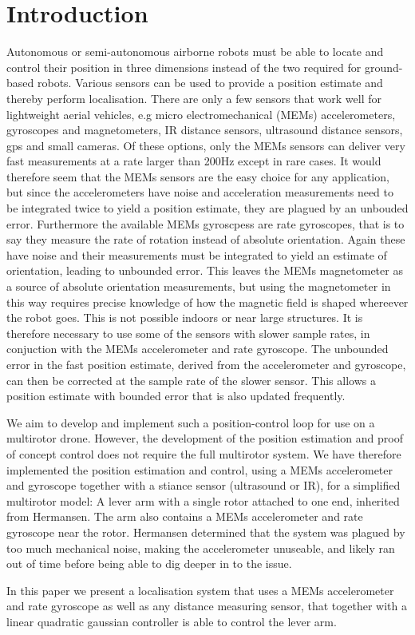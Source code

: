 \section{Introduction}
Autonomous or semi-autonomous airborne robots must be able to locate and control their position in three dimensions instead of
the two required for ground-based robots. Various sensors can be used to provide a position estimate and thereby perform localisation.
There are only a few sensors that work well for lightweight aerial vehicles, e.g micro electromechanical (MEMs) accelerometers, 
gyroscopes and magnetometers, IR distance sensors, ultrasound distance sensors, gps and small cameras. Of these options, only the MEMs
sensors can deliver very fast measurements at a rate larger than 200Hz except in rare cases. It would therefore seem that the MEMs
sensors are the easy choice for any application, but since the accelerometers have noise and acceleration measurements need to be 
integrated twice to yield a position estimate, they are plagued by an unbouded error. Furthermore the available MEMs gyroscpess are rate 
gyroscopes, that is to say they measure the rate of rotation instead of absolute orientation. Again these have noise and their measurements
must be integrated to yield an estimate of orientation, leading to unbounded error. This leaves the MEMs magnetometer as a source of
absolute orientation measurements, but using the magnetometer in this way requires precise knowledge of how the magnetic field is 
shaped whereever the robot goes. This is not possible indoors or near large structures.
It is therefore necessary to use some of the sensors with slower sample rates, in conjuction with
the MEMs accelerometer and rate gyroscope. The unbounded error in the fast position estimate, derived from the accelerometer and gyroscope,
can then be corrected at the sample rate of the slower sensor. This allows a position estimate with bounded error that is also updated
frequently. 

We aim to develop and implement such a position-control loop for use on a multirotor drone. However, the development of the position 
estimation and proof of concept control does not require the full multirotor system. We have therefore implemented the position estimation 
and control, using a MEMs accelerometer and gyroscope together with a stiance sensor (ultrasound or IR), for a simplified multirotor model: 
A lever arm with a single rotor attached to one end, inherited from Hermansen\cite{hermansen2013a}. The arm also contains a MEMs accelerometer
and rate gyroscope near the rotor. Hermansen determined that the system was plagued by too much mechanical noise, making the accelerometer
unuseable, and likely ran out of time before being able to dig deeper in to the issue.

In this paper we present a localisation system that uses a MEMs accelerometer and rate gyroscope as well as any distance measuring sensor,
that together with a linear quadratic gaussian controller is able to control the lever arm. 

